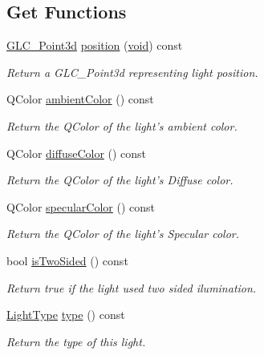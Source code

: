 \subsection*{Get Functions}
\begin{DoxyCompactItemize}
\item 
\hyperlink{glc__vector3d_8h_a4e13a9bbc7ab3d34de7e98b41836772c}{G\-L\-C\-\_\-\-Point3d} \hyperlink{class_g_l_c___light_a2dde41d70a35d06c366f2e0811798f27}{position} (\hyperlink{group___u_a_v_objects_plugin_ga444cf2ff3f0ecbe028adce838d373f5c}{void}) const 
\begin{DoxyCompactList}\small\item\em Return a G\-L\-C\-\_\-\-Point3d representing light position. \end{DoxyCompactList}\item 
Q\-Color \hyperlink{class_g_l_c___light_a651c4cd5f6ca96b3e3640f70844bd4dd}{ambient\-Color} () const 
\begin{DoxyCompactList}\small\item\em Return the Q\-Color of the light's ambient color. \end{DoxyCompactList}\item 
Q\-Color \hyperlink{class_g_l_c___light_a61485d888f751e5a5992c1324e3ff4f5}{diffuse\-Color} () const 
\begin{DoxyCompactList}\small\item\em Return the Q\-Color of the light's Diffuse color. \end{DoxyCompactList}\item 
Q\-Color \hyperlink{class_g_l_c___light_a4271143d5f970ca5cb291451db6b291f}{specular\-Color} () const 
\begin{DoxyCompactList}\small\item\em Return the Q\-Color of the light's Specular color. \end{DoxyCompactList}\item 
bool \hyperlink{class_g_l_c___light_a0679aca9723c75c61fd151ef58e00c94}{is\-Two\-Sided} () const 
\begin{DoxyCompactList}\small\item\em Return true if the light used two sided ilumination. \end{DoxyCompactList}\item 
\hyperlink{class_g_l_c___light_a3b07c40e07008c58c5da29ccabfef6a6}{Light\-Type} \hyperlink{class_g_l_c___light_a5d2df91a1b70c0e0b9f31b2f486c11a8}{type} () const 
\begin{DoxyCompactList}\small\item\em Return the type of this light. \end{DoxyCompactList}\item 

\end{DoxyCompactItemize}
